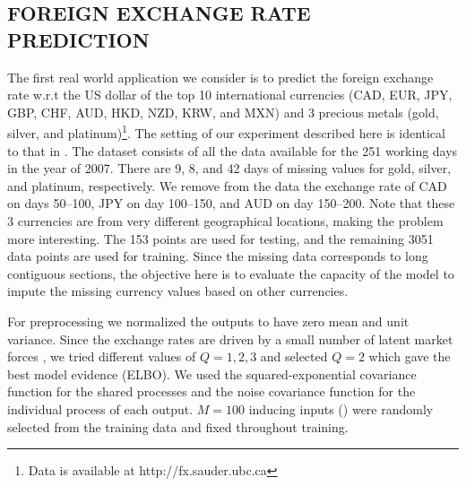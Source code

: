 \subsection{FOREIGN EXCHANGE RATE PREDICTION}
The first real world application we consider is to predict the foreign exchange rate w.r.t the US dollar of the top 10 international currencies (CAD, EUR, JPY, GBP, CHF, AUD, HKD, NZD, KRW, and MXN) and 3 precious metals (gold, silver, and platinum)\footnote{Data is available at http://fx.sauder.ubc.ca}. 
The setting of our experiment described here is identical to that in \citet{alvarez2010efficient}.
The dataset consists of all the data available for the 251 working days in the year of 2007.
There are 9, 8, and 42 days of missing values  for gold, silver, and platinum, respectively.
We remove from the data the exchange rate of CAD on days 50--100, JPY on day 100--150, and AUD on day 150--200.
Note that these 3 currencies are from very different geographical locations, making the problem more interesting. 
The 153 points are used for testing, and the remaining 3051 data points are used for training.
Since the missing data corresponds to long contiguous sections, the objective here is to evaluate the capacity of the model to impute the missing currency values based on other currencies.

For preprocessing we normalized the outputs to have zero mean and unit variance.
Since the exchange rates are driven by a small number of latent market forces \citep[see e.g.][]{alvarez2010efficient}, we tried different values of $Q = {1,2,3}$ and selected $Q = 2$ which gave the best model evidence (ELBO).
We used the squared-exponential covariance function for the shared processes and the noise covariance function for the individual process of each output.
$M = 100$ inducing inputs () were randomly selected from the training data and fixed throughout training.

